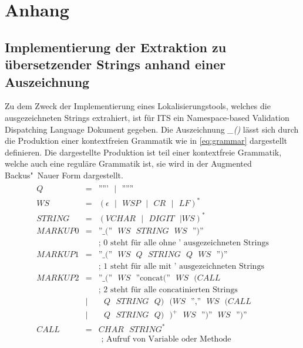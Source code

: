 \chapter{Anhang}

\section{Implementierung der Extraktion zu übersetzender Strings anhand einer Auszeichnung}
\label{sec:implementierung}
Zu dem Zweck der Implementierung eines Lokalisierungstools, welches die ausgezeichneten Strings extrahiert, ist für \ac{ITS} ein Namespace-based Validation Dispatching Language 
\autocite[Vgl.][]{ISO.2006}
Dokument gegeben.
\autocite[Vgl.][]{Filip.2013}
Die Auszeichnung \textit{\_()} lässt sich durch die Produktion einer kontextfreien Grammatik wie in \ref{eq:grammar} dargestellt definieren. Die dargestellte Produktion ist teil einer kontextfreie Grammatik, welche auch eine reguläre Grammatik ist, sie wird in der Augmented Backus"~Nauer Form 
\autocite[Vgl.][]{Crocker.2008} 
dargestellt.
\begin{align} \label{eq:grammar}
	\begin{array}{lcl}
		Q & = & \text{'''''} \text{ } | \text{ } \text{''''''} \\
		WS & = & (\epsilon \text{ } | \text{ } WSP \text{ } | \text{ } CR \text{ } |\text{ } LF)^* \\ 
		STRING & = & (VCHAR \text{ } | \text{ } DIGIT \text{ } |WS)^* \\
		MARKUP0 & = & \text{''\_(''} \text{ } WS \text{ } STRING \text{ } WS \text{ } \text{'')''} \\ 
		& & \text{; 0 steht für alle ohne ' ausgezeichneten Strings} \\
		MARKUP1 & = & \text{''\_(''} \text{ } WS \text{ } Q \text{ } STRING \text{ } Q \text{ } WS \text{ } \text{'')''} \\
		& & \text{; 1 steht für alle mit ' ausgezeichneten Strings} \\
		MARKUP2 & = & \text{''\_(''} \text{ } WS \text{ } \text{''concat(''}  \text{ } WS  \text{ } (CALL \text{ } \\
		& & \text{; 2 steht für alle concatinierten Strings} \\
		& | & \text{ } Q \text{ } STRING \text{ } Q ) \text{ } (WS  \text{ } \text{'',''} \text{ } WS \text{ } (CALL \text{ } \\
		& | & \text{ } Q \text{ } STRING \text{ } Q ) \text{ } )^+ \text{ } WS \text{ } \text{'')''} \text{ } WS  \text{ } \text{'')''} \\
		CALL & = & CHAR \text{ } STRING^* \\
		& & \text{ ; Aufruf von Variable oder Methode}
	\end{array}
\end{align}